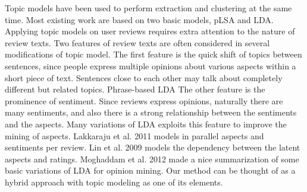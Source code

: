 Topic models have been used to perform extraction and clustering 
at the same time. Most existing work are based on two basic models, 
pLSA\cite{hofmann1999probabilistic} and LDA\cite{blei2003latent}. 
Applying topic models on user reviews requires extra attention to
the nature of review texts. Two features of review texts are often considered 
in several modifications of topic model. The first feature is the 
quick shift of topics between sentences, since people express 
multiple opinions about various aspects within a short piece of text. 
Sentences close to each other may talk about completely different but 
related topics. Phrase-based LDA The other feature is the prominence of 
sentiment. Since reviews express opinions, naturally there are 
many sentiments, and also there is a strong relationship between the 
sentiments and the aspects. Many variations of LDA exploits this 
feature to improve the mining of aspects.
Lakkaraju et al. 2011 \cite{lakkaraju2011exploiting} models in 
parallel aspects and sentiments per review. 
Lin et al. 2009 \cite{lin2009joint} models the dependency between 
the latent aspects and ratings.
Moghaddam et al. 2012 \cite{moghaddam2012design} made a nice 
summarization of some basic variations of LDA for opinion mining.
Our method can be thought of as a hybrid approach with topic modeling as
one of its elements.


